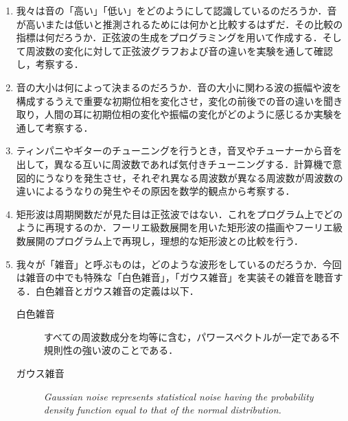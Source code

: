 \begin{enumerate}
	\item 我々は音の「高い」「低い」をどのようにして認識しているのだろうか．音が高いまたは低いと推測されるためには何かと比較するはずだ．その比較の指標は何だろうか．正弦波の生成をプログラミングを用いて作成する．そして周波数の変化に対して正弦波グラフおよび音の違いを実験を通して確認し，考察する．
	\item 音の大小は何によって決まるのだろうか．音の大小に関わる波の振幅や波を構成するうえで重要な初期位相を変化させ，変化の前後での音の違いを聞き取り，人間の耳に初期位相の変化や振幅の変化がどのように感じるか実験を通して考察する．
	\item ティンパニやギターのチューニングを行うとき，音叉やチューナーから音を出して，異なる互いに周波数であれば気付きチューニングする．計算機で意図的にうなりを発生させ，それぞれ異なる周波数が異なる周波数が周波数の違いによるうなりの発生やその原因を数学的観点から考察する．
	\item 矩形波は周期関数だが見た目は正弦波ではない．これをプログラム上でどのように再現するのか．フーリエ級数展開を用いた矩形波の描画やフーリエ級数展開のプログラム上で再現し，理想的な矩形波との比較を行う．
	\item 我々が「雑音」と呼ぶものは，どのような波形をしているのだろうか．今回は雑音の中でも特殊な「白色雑音」，「ガウス雑音」を実装その雑音を聴音する．白色雑音とガウス雑音の定義は以下．
	      \begin{description}
		      \item[白色雑音] すべての周波数成分を均等に含む，パワースペクトルが一定である不規則性の強い波のことである．\cite{whitenoise}
		      \item[ガウス雑音] \textit{Gaussian noise represents statistical noise having the probability density function equal to that of the normal distribution.}
	      \end{description}
\end{enumerate}